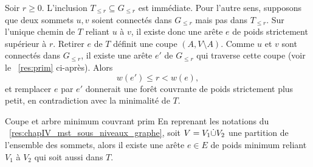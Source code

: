 \begin{Preuve}
Soir $r \ge 0$. L'inclusion $T_{\le r}\subseteq G_{\le r}$ est immédiate. Pour l'autre sens, supposons que deux sommets $u,v$ soient connectés dans $G_{\le r}$ mais pas dans $T_{\le r}$. Sur l'unique chemin de $T$ reliant $u$ à $v$, il existe donc une arête $e$ de poids strictement supérieur à $r$. Retirer $e$ de $T$ définit une coupe $(A,V\setminus A)$. Comme $u$ et $v$ sont connectés dans $G_{\le r}$, il existe une arête $e'$ de $G_{\le r}$ qui traverse cette coupe (voir le \Res~\ref{res:prim} ci-après). Alors
\[
    w(e')\le r < w(e),
\]
et remplacer $e$ par $e'$ donnerait une forêt couvrante de poids strictement plus petit, en contradiction avec la minimalité de $T$.
\end{Preuve}


\begin{Resultat}{Coupe et arbre minimum couvrant \cite{Prim1957}}{prim}
En reprenant les notations du \Res~\ref{res:chapIV_mst_sous_niveaux_graphe}, soit
 $V =  V_1 \dot \cup V_2$ une partition de l'ensemble des sommets, alors il existe une arête $e \in E$ de poids minimum reliant $V_1$ à $V_2$ qui soit aussi dans $T$.
\end{Resultat}



